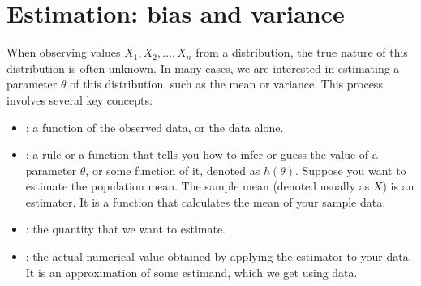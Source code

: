 \documentclass[letterpaper,10pt,english]{jupyterBook}
\begin{document}
\section{Estimation: bias and variance}
\label{\detokenize{notebooks/review_stats:estimation-bias-and-variance}}
\sphinxAtStartPar
When observing values \(X_1, X_2, \ldots, X_n\) from a distribution, the true nature of this distribution is often unknown. In many cases, we are interested in estimating a parameter \(\theta\) of this distribution, such as the mean or variance. This process involves several key concepts:
\begin{itemize}
\item {} 
\sphinxAtStartPar
{}: a function of the observed data, or the data alone.

\item {} 
\sphinxAtStartPar
{}: a rule or a function that tells you how to infer or guess the value of a parameter \(\theta\), or some function of it, denoted as \(h(\theta)\). Suppose you want to estimate the population mean. The sample mean (denoted usually as \(\bar{X}\)) is an estimator. It is a function that calculates the mean of your sample data.

\item {} 
\sphinxAtStartPar
{}: the quantity that we want to estimate.

\item {} 
\sphinxAtStartPar
{}: the actual numerical value obtained by applying the estimator to your data. It is an approximation of some estimand, which we get using data.

\end{itemize}
\end{document}
